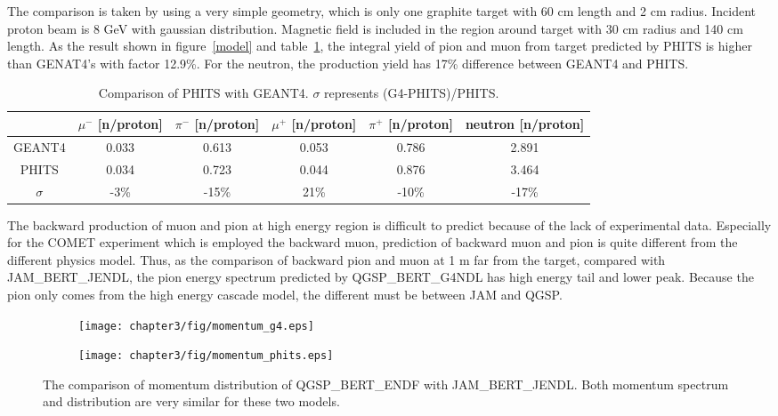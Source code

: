The comparison is taken by using a very simple geometry, which is only one graphite target with 60 cm length and 2 cm radius.
Incident proton beam is 8 GeV with gaussian distribution.
Magnetic field is included in the region around target with 30 cm radius and 140 cm length.
As the result shown in figure~\ref{model} and table~\ref{2model}, the integral yield of pion and muon from target predicted by PHITS is higher than GENAT4's with factor 12.9\%.
For the neutron, the production yield has 17\% difference between GEANT4 and PHITS.
\begin{table}[H]
 \centering
 \begin{tabular}{cccccc} \hline \hline
  & $\mu^-$ [n/proton] & $\pi^-$ [n/proton] & $\mu^+$ [n/proton] & $\pi^+$ [n/proton] & neutron [n/proton] \\ \hline
  GEANT4 & 0.033 & 0.613 & 0.053 & 0.786 & 2.891 \\
  PHITS & 0.034 & 0.723 & 0.044 & 0.876 & 3.464 \\ \hline
  $\sigma$ & -3\% & -15\% & 21\% & -10\% & -17\% \\ \hline \hline
 \end{tabular}
 \caption{Comparison of PHITS with GEANT4. $\sigma$ represents (G4-PHITS)/PHITS.}
 \label{2model}
\end{table}
The backward production of muon and pion at high energy region is difficult to predict because of the lack of experimental data.
Especially for the COMET experiment which is employed the backward muon, prediction of backward muon and pion is quite different from the different physics model.
Thus, as the comparison of backward pion and muon at 1 m far from the target, compared with JAM\_BERT\_JENDL, the pion energy spectrum predicted by QGSP\_BERT\_G4NDL has high energy tail and lower peak.
Because the pion only comes from the high energy cascade model, the different must be between JAM and QGSP.
\begin{figure}[H]
 \begin{subfigure}{0.3\textwidth}
  \centering
  \texttt{[image: chapter3/fig/momentum\_g4.eps]}
 \end{subfigure}
 \hspace{0.2\textwidth}
 \begin{subfigure}{0.3\textwidth}
  \centering
  \texttt{[image: chapter3/fig/momentum\_phits.eps]}
 \end{subfigure}
 \caption{The comparison of momentum distribution of QGSP\_BERT\_ENDF with JAM\_BERT\_JENDL. Both momentum spectrum and distribution are very similar for these two models.}
 \label{mom}
\end{figure}
